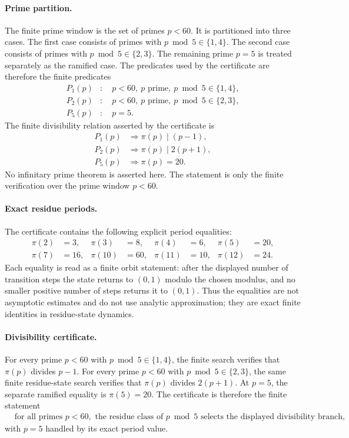 \paragraph{Prime partition.}
The finite prime window is the set of primes $p<60$. It is partitioned into three cases. The first case consists of primes with $p\bmod 5\in\{1,4\}$. The second case consists of primes with $p\bmod 5\in\{2,3\}$. The remaining prime $p=5$ is treated separately as the ramified case. The predicates used by the certificate are therefore the finite predicates
$$
\begin{aligned}
P_1(p)&:\quad p<60,\ p\text{ prime},\ p\bmod 5\in\{1,4\},\\
P_2(p)&:\quad p<60,\ p\text{ prime},\ p\bmod 5\in\{2,3\},\\
P_5(p)&:\quad p=5.
\end{aligned}
$$
The finite divisibility relation asserted by the certificate is
$$
\begin{aligned}
P_1(p)&\Rightarrow \pi(p)\mid (p-1),\\
P_2(p)&\Rightarrow \pi(p)\mid 2(p+1),\\
P_5(p)&\Rightarrow \pi(p)=20.
\end{aligned}
$$
No infinitary prime theorem is asserted here. The statement is only the finite verification over the prime window $p<60$.

\paragraph{Exact residue periods.}
The certificate contains the following explicit period equalities:
$$
\begin{aligned}
\pi(2)&=3, & \pi(3)&=8, & \pi(4)&=6, & \pi(5)&=20,\\
\pi(7)&=16, & \pi(10)&=60, & \pi(11)&=10, & \pi(12)&=24.
\end{aligned}
$$
Each equality is read as a finite orbit statement: after the displayed number of transition steps the state returns to $(0,1)$ modulo the chosen modulus, and no smaller positive number of steps returns it to $(0,1)$. Thus the equalities are not asymptotic estimates and do not use analytic approximation; they are exact finite identities in residue-state dynamics.

\paragraph{Divisibility certificate.}
For every prime $p<60$ with $p\bmod 5\in\{1,4\}$, the finite search verifies that $\pi(p)$ divides $p-1$. For every prime $p<60$ with $p\bmod 5\in\{2,3\}$, the same finite residue-state search verifies that $\pi(p)$ divides $2(p+1)$. At $p=5$, the separate ramified equality is $\pi(5)=20$. The certificate is therefore the finite statement
$$
\begin{aligned}
&\text{for all primes }p<60,\text{ the residue class of }p\bmod 5\text{ selects the displayed divisibility branch,}\end{aligned}
$$
with $p=5$ handled by its exact period value.

